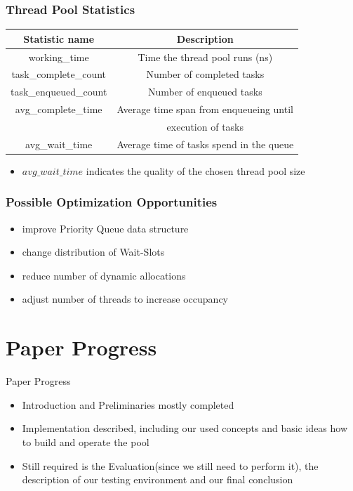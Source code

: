 \documentclass{beamer}
\begin{document}
\begin{frame}
	\frametitle{Thread Pool Statistics}
	\begin{center}
		\begin{tabular}{ c c }
			\hline
			\textbf{Statistic name}&\textbf{Description}\\
			\hline
			working\_time & Time the thread pool runs (ns) \\
			task\_complete\_count & Number of completed tasks \\
			task\_enqueued\_count & Number of enqueued tasks \\
			avg\_complete\_time & Average time span from enqueueing until \\
			& execution of tasks \\
			avg\_wait\_time & Average time of tasks spend in the queue \\
			\hline
		\end{tabular}
		\label{tab4}
	\end{center}
	\begin{itemize}
		\item $avg\_wait\_time$ indicates the quality of the chosen thread pool size
	\end{itemize}
\end{frame}

\begin{frame}
	\frametitle{Possible Optimization Opportunities}
	\begin{itemize}
		\item improve Priority Queue data structure
		\item change distribution of Wait-Slots
		\item reduce number of dynamic allocations
		\item adjust number of threads to increase occupancy
	\end{itemize}
\end{frame}

\section{Paper Progress}
\begin{frame}
	\begin{center}
	\huge Paper Progress \normalsize	
	\end{center}
\end{frame}

\begin{frame}
	\begin{itemize}
		\item Introduction and Preliminaries mostly completed
		\item Implementation described, including our used concepts and basic ideas how to build and operate the pool
		\item Still required is the Evaluation(since we still need to perform it), the description of our testing environment and our final conclusion
	\end{itemize}
\end{frame}
\end{document}
